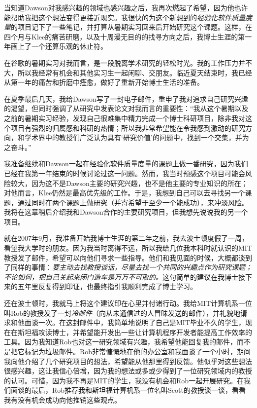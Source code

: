 \documentclass[letter,12pt]{book}
\begin{document}
\begin{CJK}{UTF8}{gbsn}
当知道Dawson对我感兴趣的领域也感兴趣之后，我再次燃起了希望，因为他也许能帮助我把这个想法变得更接近现实。我很快的为这个新想到的\emph{经验化软件质量度量}的项目记下了一些笔记，并打算从暑期实习回来后开始研究这个课题。这样，在四个月与Klee的痛苦研磨，以及十周漫无目的的找寻方向之后，我博士生涯的第一年画上了一个还算乐观的休止符。


在谷歌的暑期实习对我而言，是一段脱离学术研究的轻松时光。我的工作压力并不大，所以我经常有机会和其他实习生一起闲聊、交朋友。临近夏天结束时，我已经从第一年的痛苦和折磨中痊愈，做好了重新开始博士生活的准备。

在夏季最后几天，我给Dawson写了一封电子邮件，重申了我对追求自己研究兴趣的渴望，但同时强调了从研究中发表论文对我而言的重要性：“我从这个暑期以及之前的暑期实习经验，发现自己很难集中精力完成一个博士科研项目，除非我对这个项目有强烈的归属感和科研的热情；所以我非常希望能在令我感到激动的研究方向，和学术界中的教授们广泛认为具有‘研究价值’的问题中，找到一个交集，并为之奋斗。”

我准备继续和Dawson一起在经验化软件质量度量的课题上做一番研究，因为我们已经在我第一年结束的时候讨论过这一问题。然而，我当时预感这个项目可能会风险较大，因为这不是Dawson主要的研究兴趣，也不是他主要的专业知识的所在；对他而言，Klee仍然是最高优先级的工作。于是，我想到自己可以去寻找另一个课题，通过同时在两个课题上做研究（并寄希望于至少一个能成功），来冲淡风险。我将在这章稍后介绍我和Dawson合作的主要研究项目，但我想先说说我的另一个项目。

\breakline

就在2007年9月，我准备开始我博士生涯的第二年之前，我去波士顿度假了一周，看望我大学时的朋友。因为我当时离得不远，所以我给几位我本科时就认识的MIT教授发了邮件，希望可以向他们寻求一些指导。他们和我见面的时候，大概都谈到了同样的事情：\emph{要主动去找教授谈话，尽量去找一个共同的兴趣点作为研究课题；不论如何，把自己关起来闭门造车是万万不可取的。}这句简单的建议在我博士接下来的五年里反复得到印证，也最终指引我顺利完成了博士学习。

还在波士顿时，我就马上将这个建议印在心里并付诸行动。我给MIT计算机系一位叫Rob的教授发了一封\emph{冷邮件}（向从未通信过的人冒昧发送的邮件），并礼貌地请求和他面谈一次。在这封邮件中，我简单地说明了自己是MIT毕业不久的学生，现在在斯坦福攻读博士，并希望能开发出一些让计算机程序开发者能提高工作效率的工具。因为我知道Rob也对这一研究领域有兴趣，我希望他能回复我的邮件，而不是把它标记为垃圾邮件。Rob非常慷慨地在他的办公室和我面谈了一个小时，期间我向他介绍了几个研究项目的想法，希望能从他那里得到反馈。他似乎对这些想法很感兴趣，这让我信心倍增，因为我的想法或多或少得到了一位研究领域内的教授的认可。可惜，因为我不再是MIT的学生，我没有机会和Rob一起开展研究。在我们面谈的最后，Rob推荐我和斯坦福计算机系一位名叫Scott的教授谈一谈，看看我有没有机会成功向他推销这些观点。


\end{CJK}
\end{document}
